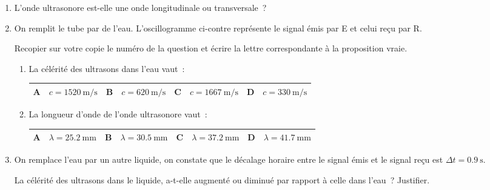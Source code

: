 \begin{enumerate}
    \item L'onde ultrasonore est-elle une onde longitudinale ou transversale~?
    \item On remplit le tube par de l'eau. L'oscillogramme ci-contre représente
          le signal émis par E et celui reçu par R.

          Recopier sur votre copie le numéro de la question et écrire la lettre
          correspondante à la proposition vraie.
          \begin{enumerate}
              \item La célérité des ultrasons dans l'eau vaut~:
                    \begin{table}[H]
                        \flushright
                        \setlength{\arrayrulewidth}{1pt}
                        \renewcommand{\arraystretch}{1.5}
                        \begin{tabularx}{.90\textwidth}{|p{3mm}|X|p{3mm}|X|p{3mm}|X|p{3mm}|X|}
                            \hline
                            A & $c=\qty{1520}{\m\per\s}$ &
                            B & $c=\qty{620}{\m\per\s}$ &
                            C & $c=\qty{1667}{\m\per\s}$ &
                            D & $c=\qty{330}{\m\per\s}$ \\
                            \hline
                        \end{tabularx}
                    \end{table}
              \item La longueur d'onde de l'onde ultrasonore vaut~:
                    \begin{table}[H]
                        \flushright
                        \setlength{\arrayrulewidth}{1pt}
                        \renewcommand{\arraystretch}{1.5}
                        \begin{tabularx}{.90\textwidth}{|p{3mm}|X|p{3mm}|X|p{3mm}|X|p{3mm}|X|}
                            \hline
                            A & $\lambda=\qty{25.2}{\mm}$ &
                            B & $\lambda=\qty{30.5}{\mm}$ &
                            C & $\lambda=\qty{37.2}{\mm}$ &
                            D & $\lambda=\qty{41.7}{\mm}$ \\
                            \hline
                        \end{tabularx}
                    \end{table}
          \end{enumerate}

    \item On remplace l'eau par un autre liquide, on constate que le décalage
          horaire entre le signal émis et le signal reçu est
          $\Delta t=\qty{0.9}{\s}$.

          La célérité des ultrasons dans le liquide, a-t-elle augmenté ou
          diminué par rapport à celle dans l'eau~? Justifier.
\end{enumerate}

